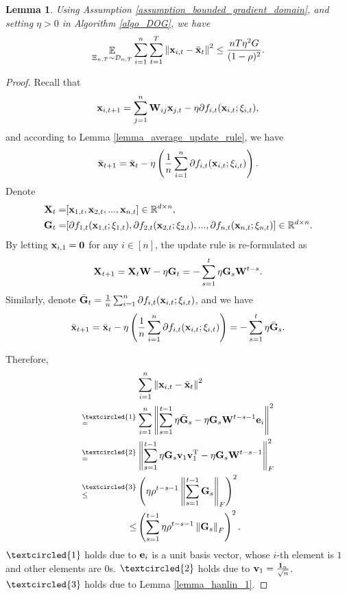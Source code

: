 \documentclass{article}
\newtheorem{Lemma}{\bf{Lemma}}
\begin{document}
\begin{Lemma}
\label{lemma_x_variance_norm_square}
Using Assumption \ref{assumption_bounded_gradient_domain}, and setting $\eta>0$ in Algorithm \ref{algo_DOG}, we have 
\begin{align}
\nonumber
\mathop{\mathbb{E}}_{ \Xi_{n,T} \sim \mathcal{D}_{n,T} } \sum_{i=1}^n\sum_{t=1}^T \left\lVert{\bf x}_{i,t} - \bar{{\bf x}}_t\right\rVert^2 \le \frac{nT\eta^2 G }{(1-\rho)^2}.
\end{align}

\end{Lemma}
\begin{proof}


Recall that 
\begin{align}
\nonumber
{\bf x}_{i,t+1} = \sum_{j=1}^n {\bf W}_{ij}{\bf x}_{j,t} - \eta \partial f_{i,t}({\bf x}_{i,t};\xi_{i,t}), 
\end{align} and according to Lemma \ref{lemma_average_update_rule}, we have 
\begin{align}
\nonumber
\bar{{\bf x}}_{t+1} = \bar{{\bf x}}_t - \eta \left( \frac{1}{n}\sum_{i=1}^n \partial f_{i,t}({\bf x}_{i,t};\xi_{i,t}) \right).
\end{align} Denote 
\begin{align}
\nonumber
{\bf X}_t = &  [{\bf x}_{1,t}, {\bf x}_{2,t}, ..., {\bf x}_{n,t}] \in \mathbb{R}^{d\times n}, \\ \nonumber
{\bf G}_t = & [\partial f_{1,t}({\bf x}_{1,t};\xi_{1,t}), \partial f_{2,t}({\bf x}_{2,t};\xi_{2,t}), ..., \partial f_{n,t}({\bf x}_{n,t};\xi_{n,t})] \in \mathbb{R}^{d\times n}.
\end{align} By letting ${\bf x}_{i,1} = {\bf 0}$ for any $i\in[n]$, the update rule is re-formulated as 
\begin{align}
\nonumber
{\bf X}_{t+1} = {\bf X}_t {\bf W} - \eta {\bf G}_t = - \sum_{s=1}^t \eta {\bf G}_s {\bf W}^{t-s}. 
\end{align} Similarly, denote $\bar{{\bf G}}_t = \frac{1}{n}\sum_{i=1}^n \partial f_{i,t}({\bf x}_{i,t};\xi_{i,t})$, and we have
\begin{align}
\bar{{\bf x}}_{t+1} = \bar{{\bf x}}_t - \eta \left( \frac{1}{n}\sum_{i=1}^n \partial f_{i,t}({\bf x}_{i,t};\xi_{i,t}) \right) = - \sum_{s=1}^t \eta \bar{{\bf G}}_s. 
\end{align}


Therefore, 
\begin{align}
\nonumber
& \sum_{i=1}^n \lrnorm{\x_{i,t} - \bar{\x}_t}^2 \\ \nonumber
\refabovecir{=}{\textcircled{1}} & \sum_{i=1}^n \lrnorm{ \sum_{s=1}^{t-1} \eta \bar{\G}_s - \eta \G_s \W^{t-s-1}\e_i }^2   \\ \nonumber
\refabovecir{=}{\textcircled{2}} & \lrnorm{ \sum_{s=1}^{t-1} \eta \G_s\v_1 \v_1\Tr - \eta \G_s \W^{t-s-1} }^2_F   \\ \nonumber
\refabovecir{\le}{\textcircled{3}} & \lrincir{ \eta \rho^{t-s-1} \lrnorm{\sum_{s=1}^{t-1}\G_s}_F}^2 \\ \nonumber
\le & \lrincir{ \sum_{s=1}^{t-1} \eta \rho^{t-s-1} \lrnorm{\G_s}_F}^2.
\end{align} $\textcircled{1}$ holds due to ${\bf e}_i$ is a unit basis vector, whose $i$-th element is $1$ and other elements are $0$s. $\textcircled{2}$ holds due to ${\bf v}_1 = \frac{{\bf 1}_n}{\sqrt{n}}$. $\textcircled{3}$ holds due to Lemma \ref{lemma_hanlin_1}. 



\end{proof}
\end{document}
